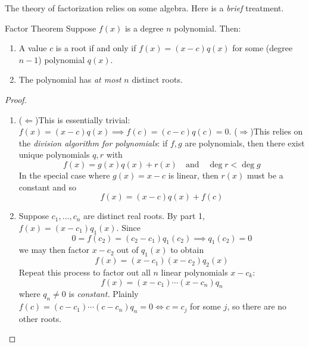 \goodbreak




The theory of factorization relies on some algebra. Here is a \emph{brief} treatment.

\begin{thm}{Factor Theorem}{}
	Suppose $f(x)$ is a degree $n$ polynomial. Then:
	\begin{enumerate}
	  \item A value $c$ is a root if and only if $f(x)=(x-c)q(x)$ for some (degree $n-1$) polynomial $q(x)$.
	  \item The polynomial has \emph{at most} $n$ distinct roots.
	\end{enumerate} 
\end{thm}

\begin{proof}
	\begin{enumerate}
	  \item ($\Leftarrow$)\lstsp This is essentially trivial: $f(x)=(x-c)q(x)\implies f(c)=(c-c)q(c)=0$.\smallbreak
		($\Rightarrow$)\lstsp This relies on the \emph{division algorithm for polynomials}: if $f,g$ are polynomials, then there exist unique polynomials $q,r$ with\footnotemark{}
		\[
			f(x)=g(x)q(x)+r(x)\quad \text{and}\quad \deg r<\deg g
		\]
		In the special case where $g(x)=x-c$ is linear, then $r(x)$ must be a constant and so
		\[
			f(x)=(x-c)q(x)+f(c)
		\]
		\item Suppose $c_1,\ldots,c_n$ are distinct real roots. By part 1, $f(x)=(x-c_1)q_1(x)$. Since
		\[
			0=f(c_2)=(c_2-c_1)q_1(c_2)\implies q_1(c_2)=0
		\]
		we may then factor $x-c_2$ out of $q_1(x)$ to obtain
		\[
			f(x)=(x-c_1)(x-c_2)q_2(x)
		\]
		Repeat this process to factor out all $n$ linear polynomials $x-c_k$:
		\[
			f(x)=(x-c_1)\cdots(x-c_n)q_n
		\]
		where $q_n\neq 0$ is \emph{constant.} Plainly $f(c)=(c-c_1)\cdots(c-c_n)q_n=0\iff c=c_j$ for some $j$, so there are no other roots.\qedhere
	\end{enumerate}
\end{proof}

